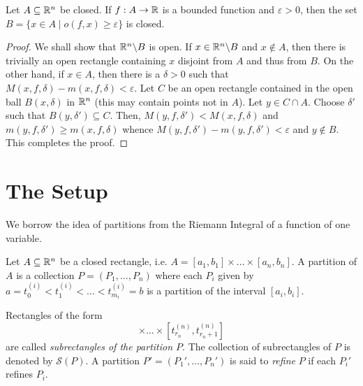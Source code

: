 \begin{theorem}
    Let $A\subseteq\mathbb{R}^n$ be closed. If $f: A\to\mathbb{R}$ is a bounded function and $\varepsilon > 0$, then the set $B = \{x\in A\mid o(f,x)\ge\varepsilon\}$ is closed.
\end{theorem}
\begin{proof}
    We shall show that $\mathbb{R}^n\backslash B$ is open. If $x\in\mathbb{R}^n\backslash B$ and $x\notin A$, then there is trivially an open rectangle containing $x$ disjoint from $A$ and thus from $B$. On the other hand, if $x\in A$, then there is a $\delta > 0$ such that $M(x,f,\delta) - m(x,f,\delta) < \varepsilon$. Let $C$ be an open rectangle contained in the open ball $B(x,\delta)$ in $\mathbb{R}^n$ (this may contain points not in $A$). Let $y\in C\cap A$. Choose $\delta'$ such that $B(y,\delta')\subseteq C$. Then, $M(y,f,\delta') < M(x,f,\delta)$ and $m(y,f,\delta')\ge m(x,f,\delta)$ whence $M(y,f,\delta') - m(y,f,\delta') < \varepsilon$ and $y\notin B$. This completes the proof.
\end{proof}

\section{The Setup}

We borrow the idea of partitions from the Riemann Integral of a function of one variable.
\begin{definition}[Partition]
    Let $A\subseteq\mathbb{R}^n$ be a closed rectangle, i.e. $A = [a_1,b_1]\times\dots\times[a_n,b_n]$. A partition of $A$ is a collection $P = (P_1,\dots,P_n)$ where each $P_i$ given by $a = t^{(i)}_0 < t^{(i)}_1 < \dots < t^{(i)}_{m_i} = b$ is a partition of the interval $[a_i,b_i]$.

    Rectangles of the form 
    \begin{equation*}
        [t^{(1)}_{r_i}, t^{(1)}_{r_i + 1}]\times\dots\times[t^{(n)}_{r_n}, t^{(n)}_{r_n + 1}]
    \end{equation*}
    are called \emph{subrectangles of the partition $P$}. The collection of subrectangles of $P$ is denoted by $\mathscr S(P)$. A partition $P' = (P_1',\dots,P_n')$ is said to \emph{refine} $P$ if each $P_i'$ refines $P_i$.
\end{definition}

